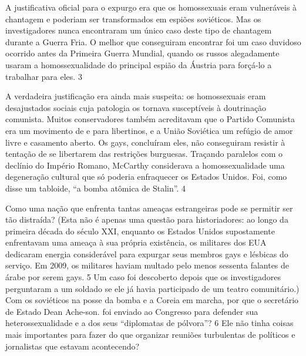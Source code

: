  
\par
 
A justificativa oficial para o expurgo era que os homossexuais eram vulneráveis ​​à chantagem e poderiam ser transformados em espiões soviéticos. Mas os investigadores nunca encontraram um único caso deste tipo de chantagem durante a Guerra Fria. O melhor que conseguiram encontrar foi um caso duvidoso ocorrido antes da Primeira Guerra Mundial, quando os russos alegadamente usaram a homossexualidade do principal espião da Áustria para forçá-lo a trabalhar para eles.
 {\color{blue} 3}  

 
\par
 
A verdadeira justificação era ainda mais suspeita: os homossexuais eram desajustados sociais cuja patologia os tornava susceptíveis à doutrinação comunista. Muitos conservadores também acreditavam que o Partido Comunista era um movimento de e para libertinos, e a União Soviética um refúgio de amor livre e casamento aberto. Os gays, concluíram eles, não conseguiram resistir à tentação de se libertarem das restrições burguesas. Traçando paralelos com o declínio do Império Romano, McCarthy considerava a homossexualidade uma degeneração cultural que só poderia enfraquecer os Estados Unidos. Foi, como disse um tabloide, “a bomba atômica de Stalin”.
 {\color{blue} 4}  

 
\par
 
Como uma nação que enfrenta tantas ameaças estrangeiras pode se permitir ser tão distraída? (Esta não é apenas uma questão para historiadores: ao longo da primeira década do século XXI, enquanto os Estados Unidos supostamente enfrentavam uma ameaça à sua própria existência, os militares dos EUA dedicaram energia considerável para expurgar seus membros gays e lésbicas do serviço. Em 2009, os militares haviam multado pelo menos sessenta falantes de árabe por serem gays.
 {\color{blue} 5}  
Um caso foi descoberto depois que os investigadores perguntaram a um soldado se ele já havia participado de um teatro comunitário.) Com os soviéticos na posse da bomba e a Coreia em marcha, por que o secretário de Estado Dean Ache-son. foi enviado ao Congresso para defender sua heterossexualidade e a dos seus “diplomatas de pólvora”?
 {\color{blue} 6}  
Ele não tinha coisas mais importantes para fazer do que organizar reuniões turbulentas de políticos e jornalistas que estavam acontecendo?
 
\par
 

